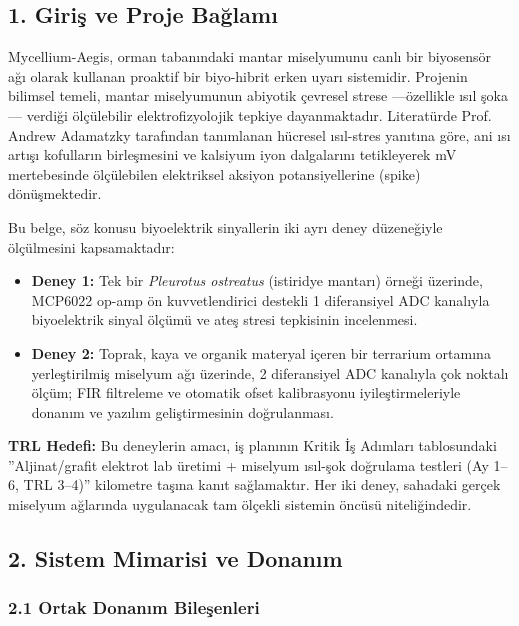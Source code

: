 \documentclass[11pt,a4paper]{article}
\begin{document}
\subsection*{1. Giriş ve Proje Bağlamı}

Mycellium-Aegis, orman tabanındaki mantar miselyumunu canlı bir biyosensör ağı olarak kullanan proaktif bir biyo-hibrit erken uyarı sistemidir. Projenin bilimsel temeli, mantar miselyumunun abiyotik çevresel strese ---özellikle ısıl şoka--- verdiği ölçülebilir elektrofizyolojik tepkiye dayanmaktadır. Literatürde Prof. Andrew Adamatzky tarafından tanımlanan hücresel ısıl-stres yanıtına göre, ani ısı artışı kofulların birleşmesini ve kalsiyum iyon dalgalarını tetikleyerek mV mertebesinde ölçülebilen elektriksel aksiyon potansiyellerine (spike) dönüşmektedir.

Bu belge, söz konusu biyoelektrik sinyallerin iki ayrı deney düzeneğiyle ölçülmesini kapsamaktadır:
\begin{itemize}[leftmargin=1cm]
  \item \textbf{Deney 1:} Tek bir \textit{Pleurotus ostreatus} (istiridye mantarı) örneği üzerinde, MCP6022 op-amp ön kuvvetlendirici destekli 1 diferansiyel ADC kanalıyla biyoelektrik sinyal ölçümü ve ateş stresi tepkisinin incelenmesi.
  \item \textbf{Deney 2:} Toprak, kaya ve organik materyal içeren bir terrarium ortamına yerleştirilmiş miselyum ağı üzerinde, 2 diferansiyel ADC kanalıyla çok noktalı ölçüm; FIR filtreleme ve otomatik ofset kalibrasyonu iyileştirmeleriyle donanım ve yazılım geliştirmesinin doğrulanması.
\end{itemize}

\textbf{TRL Hedefi:} Bu deneylerin amacı, iş planının Kritik İş Adımları tablosundaki ''Aljinat/grafit elektrot lab üretimi + miselyum ısıl-şok doğrulama testleri (Ay 1--6, TRL 3--4)'' kilometre taşına kanıt sağlamaktır. Her iki deney, sahadaki gerçek miselyum ağlarında uygulanacak tam ölçekli sistemin öncüsü niteliğindedir.

\subsection*{2. Sistem Mimarisi ve Donanım}

\subsubsection*{2.1 Ortak Donanım Bileşenleri}
\end{document}
